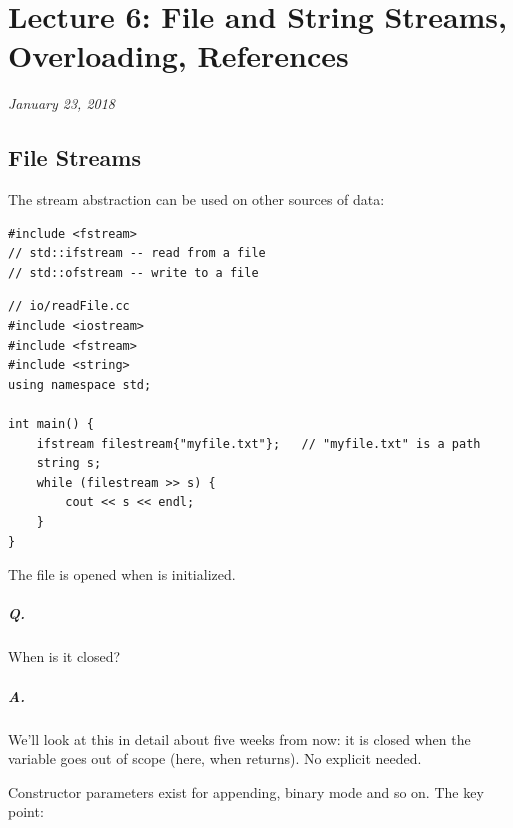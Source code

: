 \chapter{Lecture 6: File and String Streams, Overloading, References}
\begin{center}
\textit{January 23, 2018}
\end{center}

\section{File Streams}
The stream abstraction can be used on other sources of data:
\begin{lstlisting}[style=cpp]
#include <fstream>
// std::ifstream -- read from a file
// std::ofstream -- write to a file
\end{lstlisting}

\begin{lstlisting}[style=cpp]
// io/readFile.cc
#include <iostream>
#include <fstream>
#include <string>
using namespace std;

int main() {
    ifstream filestream{"myfile.txt"};   // "myfile.txt" is a path
    string s;
    while (filestream >> s) {
        cout << s << endl;
    }
}
\end{lstlisting}
The file is opened when  is initialized.

\paragraph{Q.} When is it closed?

\paragraph{A.} We'll look at this in detail about five weeks from now: it is
closed when the  variable goes out of scope (here, when
 returns). No explicit  needed.

Constructor parameters exist for appending, binary mode and so on. The key point:


